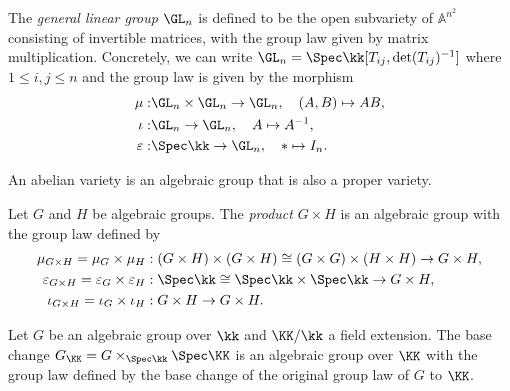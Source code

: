     \begin{example}\label{eg:general_linear_group}
        The \emph{general linear group} $\GL_n$ is defined to be the open subvariety of $\mathbb{A}^{n^2}$ consisting of invertible matrices, with the group law given by matrix multiplication.
        Concretely, we can write \(\GL_n = \Spec \kk[T_{ij}, \det(T_{ij})^{-1}]\) where \(1 \leq i,j \leq n\) and the group law is given by the morphism
        \begin{align*}
            \mu: & \GL_n \times \GL_n \to \GL_n, \quad (A,B) \mapsto AB, \\
            \iota: & \GL_n \to \GL_n, \quad A \mapsto A^{-1}, \\
            \varepsilon: & \Spec \kk \to \GL_n, \quad * \mapsto I_n.
        \end{align*}
    \end{example}

    \begin{example}\label{eg:abelian_varieties_as_algebraic_groups}
        An abelian variety is an algebraic group that is also a proper variety.
    \end{example}

    \begin{example}\label{eg:product_of_algebraic_groups}
        Let \(G\) and \(H\) be algebraic groups.
        The \emph{product} \(G \times H\) is an algebraic group with the group law defined by
        \begin{align*}
            \mu_{G \times H} = \mu_G \times \mu_H &: (G \times H) \times (G \times H) \cong (G \times G) \times (H \times H) \to G \times H, \\   
            \varepsilon_{G \times H} = \varepsilon_G \times \varepsilon_H &: \Spec \kk \cong \Spec \kk \times \Spec \kk \to G \times H, \\
            \iota_{G \times H} = \iota_G \times \iota_H &: G \times H \to G \times H.
        \end{align*}
    \end{example}

    \begin{example}\label{eg:base_change_of_algebraic_groups}
        Let \(G\) be an algebraic group over \(\kk\) and \(\KK/\kk\) a field extension.
        The base change \(G_\KK = G \times_{\Spec \kk} \Spec \KK\) is an algebraic group over \(\KK\) with the group law defined by the base change of the original group law of \(G\) to \(\KK\).
    \end{example}

